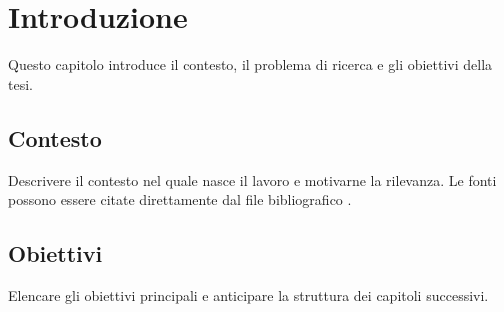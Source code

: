 \chapter{Introduzione}
\label{chap:introduction}

Questo capitolo introduce il contesto, il problema di ricerca e gli obiettivi
della tesi.

\section{Contesto}

Descrivere il contesto nel quale nasce il lavoro e motivarne la rilevanza.
Le fonti possono essere citate direttamente dal file bibliografico
\cite{lamport1994latex}.

\section{Obiettivi}

Elencare gli obiettivi principali e anticipare la struttura dei capitoli
successivi.
